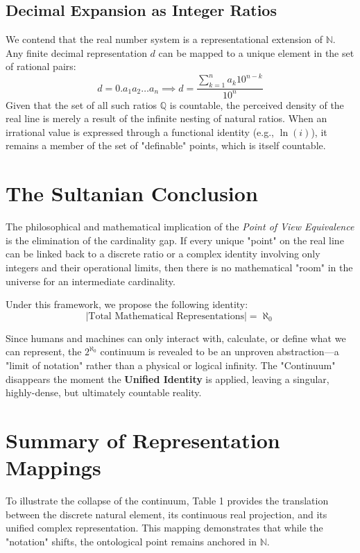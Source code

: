 \documentclass[12pt,a4paper]{article}
\begin{document}
\subsection{Decimal Expansion as Integer Ratios}
We contend that the real number system is a representational extension of $\mathbb{N}$. Any finite decimal representation $d$ can be mapped to a unique element in the set of rational pairs:
\begin{equation}
    d = 0.a_1 a_2 \dots a_n \implies d = \frac{\sum_{k=1}^n a_k 10^{n-k}}{10^n}
\end{equation}
Given that the set of all such ratios $\mathbb{Q}$ is countable, the perceived density of the real line is merely a result of the infinite nesting of natural ratios. When an irrational value is expressed through a functional identity (e.g., $\ln(i)$), it remains a member of the set of "definable" points, which is itself countable.

\section{The Sultanian Conclusion}

The philosophical and mathematical implication of the \textit{Point of View Equivalence} is the elimination of the cardinality gap. If every unique "point" on the real line can be linked back to a discrete ratio or a complex identity involving only integers and their operational limits, then there is no mathematical "room" in the universe for an intermediate cardinality.

Under this framework, we propose the following identity:
\begin{equation}
    |\text{Total Mathematical Representations}| = \aleph_0
\end{equation}

Since humans and machines can only interact with, calculate, or define what we can represent, the $2^{\aleph_0}$ continuum is revealed to be an unproven abstraction—a "limit of notation" rather than a physical or logical infinity. The "Continuum" disappears the moment the \textbf{Unified Identity} is applied, leaving a singular, highly-dense, but ultimately countable reality.

\section{Summary of Representation Mappings}
To illustrate the collapse of the continuum, Table 1 provides the translation between the discrete natural element, its continuous real projection, and its unified complex representation. This mapping demonstrates that while the "notation" shifts, the ontological point remains anchored in $\mathbb{N}$.
\end{document}
